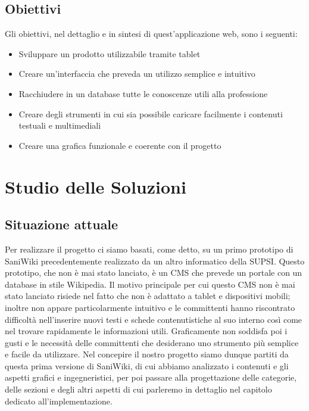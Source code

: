 \documentclass[twoside]{supsistudent}
\begin{document}
\section{Obiettivi}
Gli obiettivi, nel dettaglio e in sintesi di quest'applicazione web, sono i seguenti:
\begin{itemize}
\item Sviluppare un prodotto utilizzabile tramite tablet
\item Creare un’interfaccia che preveda un utilizzo semplice e intuitivo
\item Racchiudere in un database tutte le conoscenze utili alla professione
\item Creare degli strumenti in cui sia possibile caricare facilmente i contenuti testuali e multimediali
\item Creare una grafica funzionale e coerente con il progetto
\end{itemize}





\chapter{Studio delle Soluzioni}

\section{Situazione attuale}
Per realizzare il progetto ci siamo basati, come detto, su un primo prototipo di SaniWiki precedentemente realizzato da un altro informatico della SUPSI. Questo prototipo, che non è mai stato lanciato, è un CMS che prevede un portale con un database in stile Wikipedia. Il motivo principale per cui questo CMS non è mai stato lanciato risiede nel fatto che non è adattato a tablet e dispositivi mobili; inoltre non appare particolarmente intuitivo e le committenti hanno riscontrato difficoltà nell’inserire nuovi testi e schede contenutistiche al suo interno così come nel trovare rapidamente le informazioni utili. Graficamente non soddisfa poi i gusti e le necessità delle committenti che desiderano uno strumento più semplice e facile da utilizzare. 
Nel concepire il nostro progetto siamo dunque partiti da questa prima versione di SaniWiki, di cui abbiamo analizzato i contenuti e gli aspetti grafici e ingegneristici, per poi passare alla progettazione delle categorie, delle sezioni e degli altri aspetti di cui parleremo in dettaglio nel capitolo dedicato all'implementazione.
\end{document}
